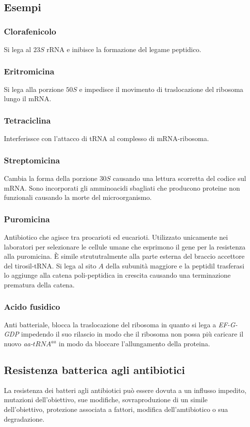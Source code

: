\subsection{Esempi}
\subsubsection{Clorafenicolo}
Si lega al $23S$ rRNA e inibisce la formazione del legame peptidico. 
\subsubsection{Eritromicina}
Si lega alla porzione $50S$ e impedisce il movimento di traslocazione del ribosoma lungo il mRNA.
\subsubsection{Tetraciclina}
Interferissce con l'attacco di tRNA al complesso di mRNA-ribosoma.
\subsubsection{Streptomicina}
Cambia la forma della porzione $30S$ causando una lettura scorretta del codice sul mRNA. Sono incorporati gli amminoacidi sbagliati che producono proteine non funzionali causando la morte
del microorganismo.
\subsubsection{Puromicina}
Antibiotico che agisce tra procarioti ed eucarioti. Utilizzato unicamente nei laboratori per selezionare le cellule umane che esprimono il gene per la resistenza alla puromicina. \`E
simile strututralmente alla parte esterna del braccio accettore del tirosil-tRNA. Si lega al sito $A$ della subunit\`a maggiore e la peptidil trasferasi lo aggiunge alla catena 
poli-peptidica in crescita causando una terminazione prematura della catena. 
\subsubsection{Acido fusidico}
Anti batteriale, blocca la traslocazione del ribosoma in quanto si lega a \emph{EF-G-GDP} impedendo il suo rilascio in modo che il ribosoma non possa pi\`u caricare il nuovo
\emph{aa-$tRNA^{aa}$} in modo da bloccare l'allungamento della proteina. 
\subsection{Resistenza batterica agli antibiotici}
La resistenza dei batteri agli antibiotici pu\`o essere dovuta a un influsso impedito, mutazioni dell'obiettivo, sue modifiche, sovraproduzione di un simile dell'obiettivo, protezione
associata a fattori, modifica dell'amtibiotico o sua degradazione. 
